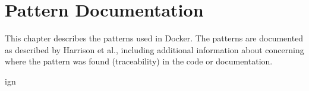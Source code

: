 
\clearpage

\chapter{Pattern Documentation}
\label{ch:patterns}
This chapter describes the patterns used in Docker. The patterns are documented as described by Harrison et al.\cite{usingpatternscapture}, including additional information about concerning where the pattern was found (traceability) in the code or documentation.



ign{
	
	
	
	
	
	
	
}